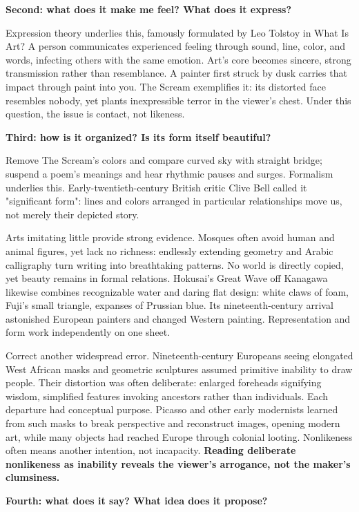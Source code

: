 \textbf{Second: what does it make me feel? What does it express?}

Expression theory underlies this, famously formulated by Leo Tolstoy in What Is Art? A person communicates experienced feeling through sound, line, color, and words, infecting others with the same emotion. Art's core becomes sincere, strong transmission rather than resemblance. A painter first struck by dusk carries that impact through paint into you. The Scream exemplifies it: its distorted face resembles nobody, yet plants inexpressible terror in the viewer's chest. Under this question, the issue is contact, not likeness.

\textbf{Third: how is it organized? Is its form itself beautiful?}

Remove The Scream's colors and compare curved sky with straight bridge; suspend a poem's meanings and hear rhythmic pauses and surges. Formalism underlies this. Early-twentieth-century British critic Clive Bell called it "significant form": lines and colors arranged in particular relationships move us, not merely their depicted story.

Arts imitating little provide strong evidence. Mosques often avoid human and animal figures, yet lack no richness: endlessly extending geometry and Arabic calligraphy turn writing into breathtaking patterns. No world is directly copied, yet beauty remains in formal relations. Hokusai's Great Wave off Kanagawa likewise combines recognizable water and daring flat design: white claws of foam, Fuji's small triangle, expanses of Prussian blue. Its nineteenth-century arrival astonished European painters and changed Western painting. Representation and form work independently on one sheet.

Correct another widespread error. Nineteenth-century Europeans seeing elongated West African masks and geometric sculptures assumed primitive inability to draw people. Their distortion was often deliberate: enlarged foreheads signifying wisdom, simplified features invoking ancestors rather than individuals. Each departure had conceptual purpose. Picasso and other early modernists learned from such masks to break perspective and reconstruct images, opening modern art, while many objects had reached Europe through colonial looting. Nonlikeness often means another intention, not incapacity. \textbf{Reading deliberate nonlikeness as inability reveals the viewer's arrogance, not the maker's clumsiness.}

\textbf{Fourth: what does it say? What idea does it propose?}


